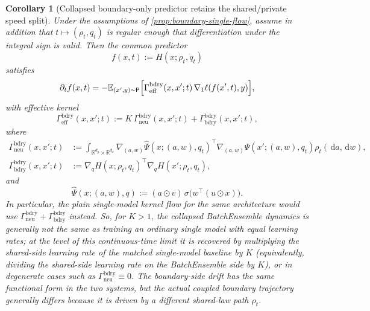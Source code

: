 \documentclass[11pt]{article}
\newtheorem{corollary}[theorem]{Corollary}
\theoremstyle{definition}
\newcommand{\R}{\mathbb{R}}
\newcommand{\E}{\mathbb{E}}
\newcommand{\dd}{\,\mathrm{d}}
\begin{document}
\begin{corollary}[Collapsed boundary-only predictor retains the shared/private speed split]
\label{cor:boundary-single-kernel}
Under the assumptions of \cref{prop:boundary-single-flow}, assume in addition
that $t\mapsto(\rho_t,q_t)$ is regular enough that differentiation under the
integral sign is valid. Then the common predictor
\[
  f(x,t):=H(x;\rho_t,q_t)
\]
satisfies
\begin{equation}
  \partial_t f(x,t)
  =
  -\E_{(x',y)\sim\mathsf P}
  \Bigl[
    \Gamma_{\mathrm{eff}}^{\mathrm{bdry}}(x,x';t)\,
    \nabla_1\ell(f(x',t),y)
  \Bigr],
  \label{eq:collapsed-bdry-output}
\end{equation}
with effective kernel
\begin{equation}
  \Gamma_{\mathrm{eff}}^{\mathrm{bdry}}(x,x';t)
  :=
  K\,\Gamma_{\mathrm{neu}}^{\mathrm{bdry}}(x,x';t)
  +
  \Gamma_{\mathrm{bdry}}^{\mathrm{bdry}}(x,x';t),
  \label{eq:collapsed-bdry-keff}
\end{equation}
where
\begin{align}
  \Gamma_{\mathrm{neu}}^{\mathrm{bdry}}(x,x';t)
  &:=
  \int_{\R^{d_y}\times\R^{d_x}}
  \nabla_{(a,w)}\widehat\Psi(x;(a,w),q_t)^\top
  \nabla_{(a,w)}\widehat\Psi(x';(a,w),q_t)
  \rho_t(\dd a,\dd w),
  \label{eq:collapsed-bdry-kneu}\\
  \Gamma_{\mathrm{bdry}}^{\mathrm{bdry}}(x,x';t)
  &:=
  \nabla_q H(x;\rho_t,q_t)^\top
  \nabla_q H(x';\rho_t,q_t),
  \label{eq:collapsed-bdry-kbdry}
\end{align}
and
\[
  \widehat\Psi(x;(a,w),q)
  :=
  (a\odot v)\,\sigma\!\bigl(w^\top(u\odot x)\bigr).
\]
In particular, the plain single-model kernel flow for the same architecture
would use
\(
  \Gamma_{\mathrm{neu}}^{\mathrm{bdry}}+\Gamma_{\mathrm{bdry}}^{\mathrm{bdry}}
\)
instead. So, for $K>1$, the collapsed BatchEnsemble dynamics is generally not
the same as training an ordinary single model with equal learning rates; at
the level of this continuous-time limit it is recovered by multiplying the
shared-side learning rate of the matched single-model baseline by $K$
(equivalently, dividing the shared-side learning rate on the BatchEnsemble
side by $K$), or in
degenerate cases such as
\(
  \Gamma_{\mathrm{neu}}^{\mathrm{bdry}}\equiv 0
\). The boundary-side drift has the same functional form in the two systems,
but the actual coupled boundary trajectory generally differs because it is
driven by a different shared-law path $\rho_t$.
\end{corollary}
\end{document}
